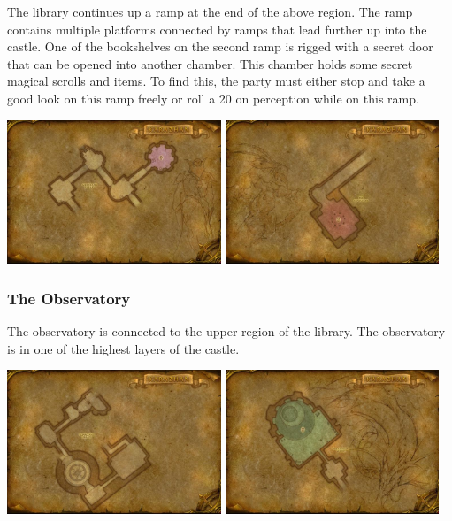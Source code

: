 The library continues up a ramp at the end of the above region. The ramp contains multiple platforms connected by ramps that lead further up into the castle. One of the bookshelves on the second ramp is rigged with a secret door that can be opened into another chamber. This chamber holds some secret magical scrolls and items. To find this, the party must either stop and take a good look on this ramp freely or roll a 20 on perception while on this ramp.

\begin{center}
	\includegraphics[width=0.48\textwidth]{img/Karazhan/cropped-3457-10.jpg}
	\includegraphics[width=0.48\textwidth]{img/Karazhan/cropped-3457-11.jpg}
\end{center}

\subsubsection{The Observatory}

The observatory is connected to the upper region of the library. The observatory is in one of the highest layers of the castle.

\begin{center}
	\includegraphics[width=0.48\textwidth]{img/Karazhan/cropped-3457-12.jpg}
	\includegraphics[width=0.48\textwidth]{img/Karazhan/cropped-3457-13.jpg}
\end{center}

